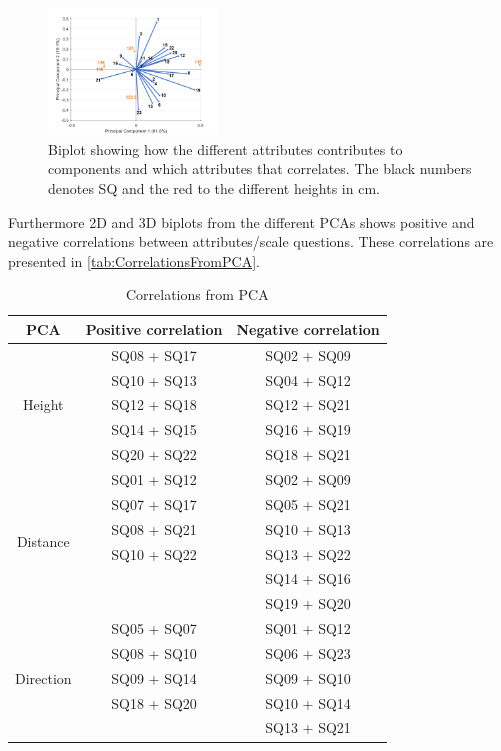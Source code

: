 %
\begin{figure}
	\centering
	\includegraphics[width = 0.40\textwidth]{Figure/RHeight-Biplot.png}
	\setlength{} 
	\caption{Biplot showing how the different attributes contributes to components and which attributes that correlates. The black numbers denotes SQ and the red to the different heights in cm.}
	\label{fig:biplot}
\end{figure}
\noindent
%
Furthermore 2D and 3D biplots from the different PCAs shows positive and negative correlations between attributes/scale questions. These correlations are presented in \autoref{tab:CorrelationsFromPCA}.
%
\begin{table}
	\centering
	\caption{Correlations from PCA}
	\label{tab:CorrelationsFromPCA} 
	\begin{tabular}{ c|c|c }
		\centering
		PCA & Positive correlation & Negative correlation \\ \hline
		\multirow{5}{*}{Height} & SQ08  + SQ17 & SQ02  + SQ09 \\
		& SQ10 + SQ13 & SQ04 + SQ12 \\
		& SQ12 + SQ18 & SQ12 + SQ21 \\
		& SQ14 + SQ15 & SQ16 + SQ19 \\
		& SQ20 + SQ22 & SQ18 + SQ21\\ \hline
		\multirow{6}{*}{Distance} & SQ01 + SQ12 & SQ02 + SQ09 \\
		& SQ07 + SQ17 & SQ05 + SQ21 \\
		& SQ08 + SQ21 & SQ10 + SQ13 \\
		& SQ10 + SQ22 & SQ13 + SQ22 \\
		&  & SQ14 + SQ16 \\	
		&  & SQ19 + SQ20 \\ \hline	
		\multirow{5}{*}{Direction} 
		& SQ05 + SQ07 & SQ01 + SQ12 \\
		& SQ08 + SQ10 & SQ06 + SQ23 \\
		& SQ09 + SQ14 & SQ09 + SQ10 \\
		& SQ18 + SQ20 & SQ10 + SQ14 \\
		&  & SQ13 + SQ21
	
	\end{tabular}        
\end{table}
\noindent
%

